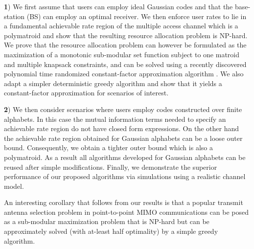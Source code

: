 \documentclass[11pt] {article}
\begin{document}
{\textbf 1)} We first assume that users can employ ideal Gaussian codes and that the base-station (BS) can employ an optimal receiver. We then enforce user rates to lie in a fundamental achievable rate region of the multiple access channel which is a polymatroid and show that the resulting resource allocation problem is NP-hard. We prove that the resource allocation problem can however be formulated as the maximization of a monotonic sub-modular set function subject to one matroid and multiple knapsack constraints, and can be solved using a  recently discovered polynomial time randomized constant-factor approximation  algorithm   \cite{bansal:sparse}. We also adapt a  simpler  deterministic greedy algorithm and show that it  yields a constant-factor approximation  for  scenarios of interest.

        {\textbf 2)} We then consider  scenarios where users employ codes constructed over finite alphabets. In this case the mutual information terms needed to specify  an achievable rate region   do not have closed form expressions. On the other hand the achievable rate region obtained for Gaussian alphabets can be a loose outer bound. Consequently, we obtain a tighter outer bound which is also a polymatroid.  As a result all algorithms developed for Gaussian alphabets can be reused after simple modifications. Finally, we
demonstrate the superior performance of our proposed algorithms via simulations using a realistic channel model.


An interesting corollary that follows  from our results is that a popular transmit antenna selection problem in point-to-point MIMO communications  can be posed as a sub-modular maximization problem that is NP-hard but can be approximately solved (with  at-least half optimality) by a simple greedy algorithm.
\end{document}
